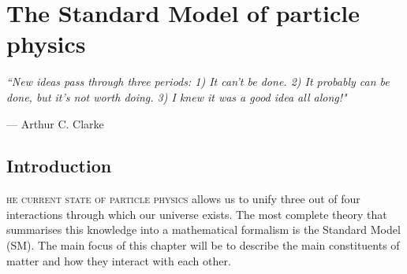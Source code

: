 \chapter{The Standard Model of particle physics}
\label{ch:theory}
\epigraph{\itshape``New ideas pass through three periods: 1) It can't be done. 2) It probably can be done, but it's not worth doing. 3) I knew it was a good idea all along!"}{--- \textup{Arthur C. Clarke}}
\mediumlinespacing
\section{Introduction}






\hspace{10pt}\lettrine[lines=2]{}{he current state of particle physics} allows us to unify three out of four interactions through which our universe exists. The most complete theory that summarises this knowledge into a mathematical formalism is the Standard Model (SM). The main focus of this chapter will be to describe the main constituents of matter and how they interact with each other.

